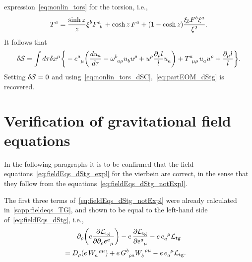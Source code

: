 \documentclass[
final,
11pt,
a4paper,
DIV=11,
headinclude=true,
footinclude=false,
bibliography=totoc,
twoside=true,  %
BCOR=5mm
]{scrbook}
\begin{document}
\begin{subappendices}
expression~\eqref{eq:nonlin_tors} for the torsion, i.e.,
\begin{equation*}
  T^a = \frac{\sinh z}{z} \xi^b F\ind{^a_b} + \cosh z\, F^a + (1 
  - \cosh z) \frac{\xi_b F^b \xi^a}{\xi^2}.
\end{equation*}
It follows that
\begin{equation*}
  \delta \mc{S} = \int d\tau \delta x^\mu \bigg\{ 
  - e\ind{^a_\mu} \bigg( \frac{du_a}{d\tau} 
  - \omega\ind{^b_{a\rho}} u\ind{_b} u^\rho + u^\rho 
  \frac{\pd_\rho l}{l} u\ind{_a} \bigg) + T\ind{^a_{\mu\rho}} 
  u\ind{_a} u^\rho + \frac{\pd_\mu l}{l} \bigg\}.
\end{equation*}
Setting $\delta \mathcal{S} = 0$ and 
using~\eqref{eq:nonlin_tors_dSC},~\eqref{eq:partEOM_dStg} is 
recovered.

\section{Verification of gravitational field equations}
\label{app:verif_grav_feqs_dStg}

In the following paragraphs it is to be confirmed that the field 
equations~\eqref{eq:fieldEqs_dStg_expl} for the vierbein are 
correct, in the sense that they follow from the 
equations~\eqref{eq:fieldEqs_dStg_notExpl}.

The first three terms of~\eqref{eq:fieldEqs_dStg_notExpl} were 
already calculated in~\ref{sapp:fieldeqs_TG}, and shown to be 
equal to the left-hand side of~\eqref{eq:fieldEqs_dStg}, i.e.,
\begin{multline}
\label{eq:feqs_dStg_subres1}
  \pd_\rho \bigg(e \frac{\pd \mc{L}_\mrm{tg}}{\pd \pd_\rho 
    e\ind{^a_\mu}} \bigg) - e\, \frac{\pd \mc{L}_\mrm{tg}}{\pd 
    e\ind{^a_\mu}} - e\, e\ind{_a^\mu} \mc{L}_\mrm{tg} \\
  = D_\rho (e\, W\ind{_a^{\rho\mu}}) + e\, G\ind{^b_{\rho a}} 
  W\ind{_b^{\rho\mu}} - e\, e\ind{_a^\mu} \mathcal{L}_\mrm{tg}.
  \hspace{1em}
\end{multline}


\end{subappendices}
\end{document}
